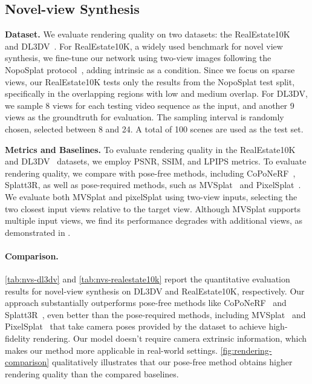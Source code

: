 \subsection{Novel-view Synthesis}
\noindent\textbf{Dataset.} 
We evaluate rendering quality on two datasets: the RealEstate10K~\cite{zhou2018stereo}  and DL3DV~\cite{Ling_2024_CVPR}. For RealEstate10K, a widely used benchmark for novel view synthesis, we fine-tune our network using two-view images following the NopoSplat protocol~\cite{ye2024no}, adding intrinsic as a condition. Since we focus on sparse views, our RealEstate10K tests only the results from the NopoSplat test split, specifically in the overlapping regions with low and medium overlap.
For DL3DV, we sample 8 views for each testing video sequence as the input, and another 9 views as the groundtruth for evaluation. The sampling interval is randomly chosen, selected between 8 and 24. A total of 100 scenes are used as the test set.


\noindent\textbf{Metrics and Baselines.}
To evaluate rendering quality in the RealEstate10K~\cite{zhou2018stereo} and DL3DV~\cite{Ling_2024_CVPR} datasets, we employ PSNR, SSIM, and LPIPS metrics.
To evaluate rendering quality, we compare with pose-free methods, including CoPoNeRF~\cite{hong2023unifying}, Splatt3R, as well as pose-required methods, such as MVSplat~\cite{chen2024mvsplat} and PixelSplat~\cite{Charatan_2024_CVPR}.
We evaluate both MVSplat and pixelSplat using two-view inputs, selecting the two closest input views relative to the target view. Although MVSplat supports multiple input views, we find its performance degrades with additional views, as demonstrated in \supp. 
% 





\paragraph{Comparison.}
\cref{tab:nvs-dl3dv} and \cref{tab:nvs-realestate10k} report the quantitative evaluation results for novel-view synthesis on DL3DV and RealEstate10K, respectively. 
Our approach substantially outperforms pose-free methods like CoPoNeRF~\cite{hong2023unifying} and Splatt3R~\cite{smart2024splatt3r}, even better than the pose-required methods, including MVSplat~\cite{chen2024mvsplat} and PixelSplat~\cite{Charatan_2024_CVPR} that take camera poses provided by the dataset to achieve high-fidelity rendering. Our model doesn't require camera extrinsic information, which makes our method more applicable in real-world settings. 
\cref{fig:rendering-comparison} qualitatively illustrates that our pose-free method obtains higher rendering quality than the compared baselines.

